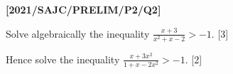 \item \textbf{{[}2021/SAJC/PRELIM/P2/Q2{]}} 

Solve algebraically the inequality $\frac{x+3}{x^{2}+x-2}>-1$. \hfill{}{[}3{]}

Hence solve the inequality $\frac{x+3x^{2}}{1+x-2x^{2}}>-1.$ \hfill{}{[}2{]}
